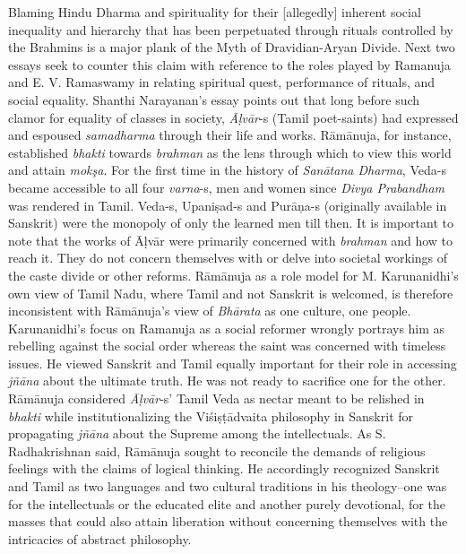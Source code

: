 Blaming Hindu Dharma and spirituality for their [allegedly] inherent social inequality and hierarchy that has been perpetuated through rituals controlled by the Brahmins is a major plank of the Myth of Dravidian-Aryan Divide. Next two essays seek to counter this claim with reference to the roles played by Ramanuja and E. V. Ramaswamy in relating spiritual quest, performance of rituals, and social equality. Shanthi Narayanan’s essay points out that long before such clamor for equality of classes in society, \textit{Āḷvār}-s (Tamil poet-saints) had expressed and espoused \textit{samadharma} through their life and works. Rāmānuja, for instance, established \textit{bhakti} towards \textit{brahman} as the lens through which to view this world and attain \textit{mokşa}. For the first time in the history of \textit{Sanātana Dharma}, Veda-s became accessible to all four \textit{varna}-s, men and women since \textit{Divya Prabandham} was rendered in Tamil. Veda-s, Upaniṣad-s and Purāņa-s (originally available in Sanskrit) were the monopoly of only the learned men till then. It is important to note that the works of Āḷvār were primarily concerned with \textit{brahman} and how to reach it. They do not concern themselves with or delve into societal workings of the caste divide or other reforms. Rāmānuja as a role model for M. Karunanidhi’s own view of Tamil Nadu, where Tamil and not Sanskrit is welcomed, is therefore inconsistent with Rāmānuja’s view of \textit{Bhārata} as one culture, one people. Karunanidhi’s focus on Ramanuja as a social reformer wrongly portrays him as rebelling against the social order whereas the saint was concerned with timeless issues. He viewed Sanskrit and Tamil equally important for their role in accessing \textit{jñāna} about the ultimate truth. He was not ready to sacrifice one for the other. Rāmānuja considered \textit{Āḷvār}-s’ Tamil Veda as nectar meant to be relished in \textit{bhakti} while institutionalizing the Viśiṣṭādvaita philosophy in Sanskrit for propagating \textit{jñāna} about the Supreme among the intellectuals. As S. Radhakrishnan said, Rāmānuja sought to reconcile the demands of religious feelings with the claims of logical thinking. He accordingly recognized Sanskrit and Tamil as two languages and two cultural traditions in his theology--one was for the intellectuals or the educated elite and another purely devotional, for the masses that could also attain liberation without concerning themselves with the intricacies of abstract philosophy.

